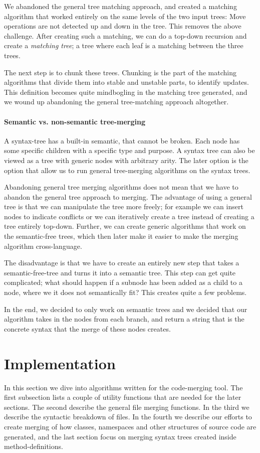 \documentclass[11pt]{article}
\begin{document}
We abandoned the general tree matching approach, and created a matching algorithm that worked entirely on the same levels of the two input trees: Move operations are not detected up and down in the tree. This removes the above challenge. After creating such a matching, we can do a top-down recursion and create a \textit{matching tree}; a tree where each leaf is a matching between the three trees. 

The next step is to chunk these trees. Chunking is the part of the matching algorithms that divide them into stable and unstable parts, to identify updates. This definition becomes quite mindbogling in the matching tree generated, and we wound up abandoning the general tree-matching approach altogether.
 
\paragraph{Semantic vs. non-semantic tree-merging} A syntax-tree has a built-in semantic, that cannot be broken. Each node has some specific children with a specific type and purpose. A syntax tree can also be viewed as a tree with generic nodes with arbitrary arity. The later option is the option that allow us to run general tree-merging algorithms on the syntax trees.

Abandoning general tree merging algorithms does not mean that we have to abandon the general tree approach to merging. The advantage of using a general tree is that we can manipulate the tree more freely; for example we can insert nodes to indicate conflicts or we can iteratively create a tree instead of creating a tree entirely top-down. Further, we can create generic algorithms that work on the semantic-free trees, which then later make it easier to make the merging algorithm cross-language.

The disadvantage is that we have to create an entirely new step that takes a semantic-free-tree and turns it into a semantic tree. This step can get quite complicated; what should happen if a subnode has been added as a child to a node, where we it does not semantically fit? This creates quite a few problems.

In the end, we decided to only work on semantic trees and we decided that our algorithm takes in the nodes from each branch, and return a string that is the concrete syntax that the merge of these nodes creates.

\clearpage
\section{Implementation}
In this section we dive into algorithms written for the code-merging tool. The first subsection lists a couple of utility functions that are needed for the later sections. The second describe the general file merging functions. In the third we describe the syntactic breakdown of files. In the fourth we describe our efforts to create merging of how classes, namespaces and other structures of source code are generated, and the last section focus on merging syntax trees created inside method-definitions.
\end{document}
